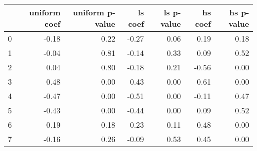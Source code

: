 \begin{tabular}{lrrrrrr}
\toprule
 & uniform coef & uniform p-value & ls coef & ls p-value & hs coef & hs p-value \\
\midrule
0 & -0.18 & 0.22 & -0.27 & 0.06 & 0.19 & 0.18 \\
1 & -0.04 & 0.81 & -0.14 & 0.33 & 0.09 & 0.52 \\
2 & 0.04 & 0.80 & -0.18 & 0.21 & -0.56 & 0.00 \\
3 & 0.48 & 0.00 & 0.43 & 0.00 & 0.61 & 0.00 \\
4 & -0.47 & 0.00 & -0.51 & 0.00 & -0.11 & 0.47 \\
5 & -0.43 & 0.00 & -0.44 & 0.00 & 0.09 & 0.52 \\
6 & 0.19 & 0.18 & 0.23 & 0.11 & -0.48 & 0.00 \\
7 & -0.16 & 0.26 & -0.09 & 0.53 & 0.45 & 0.00 \\
\bottomrule
\end{tabular}
